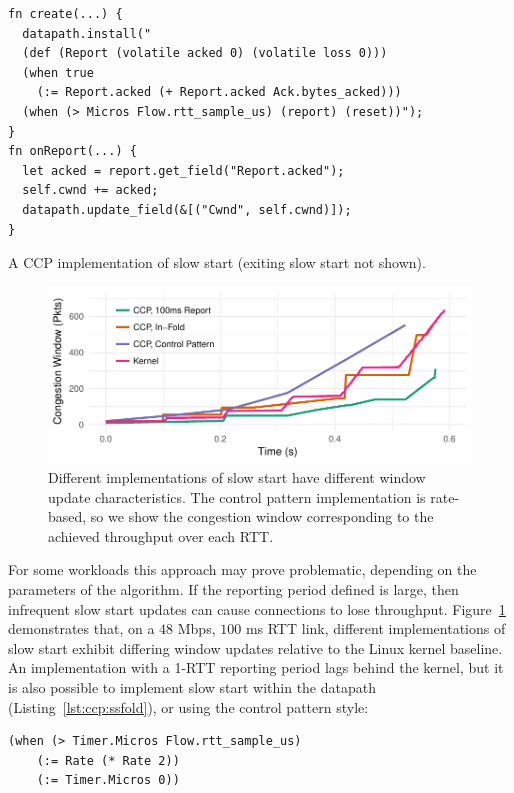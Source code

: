\begin{listing}[t]
{\footnotesize
\begin{verbatim}
fn create(...) {
  datapath.install("
  (def (Report (volatile acked 0) (volatile loss 0)))
  (when true 
    (:= Report.acked (+ Report.acked Ack.bytes_acked)))
  (when (> Micros Flow.rtt_sample_us) (report) (reset))");
}
fn onReport(...) {
  let acked = report.get_field("Report.acked");
  self.cwnd += acked;
  datapath.update_field(&[("Cwnd", self.cwnd)]);
}
\end{verbatim}
}
\caption{A CCP implementation of slow start (exiting slow start not shown).} \label{lst:ccp:ss}
\end{listing}

\begin{figure}
    \centering
    \includegraphics[width=\columnwidth]{img/ss-evo}
    \caption{Different implementations of slow start have different window update characteristics. The control pattern implementation is rate-based, so we show the congestion window corresponding to the achieved throughput over each RTT.}
    \label{fig:ccp:ss}
\end{figure}

For some workloads this approach may prove problematic, depending on the parameters of the algorithm. If the reporting period defined is large, then infrequent slow start updates can cause connections to lose throughput.
Figure~\ref{fig:ccp:ss} demonstrates that, on a $48$ Mbps, $100$ ms RTT link, different implementations of slow start exhibit differing window updates relative to the Linux kernel baseline.
An implementation with a 1-RTT reporting period lags behind the kernel, but it is also possible to implement slow start within the datapath (Listing~\ref{lst:ccp:ssfold}), or using the control pattern style: 

{\footnotesize
\begin{verbatim}
(when (> Timer.Micros Flow.rtt_sample_us)
    (:= Rate (* Rate 2))
    (:= Timer.Micros 0))
\end{verbatim}
}

